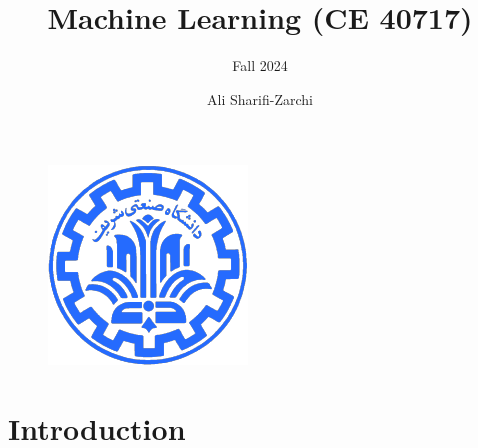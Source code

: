 \documentclass[serif, aspectratio=169]{beamer}
\author{Ali Sharifi-Zarchi}
\title{Machine Learning (CE 40717)}
\subtitle{Fall 2024}
\institute{
    CE Department \\
    Sharif University of Technology
}
\begin{document}
\begin{frame}
    \titlepage
    \vspace*{-0.6cm}
    \begin{figure}[htpb]
        \begin{center}
            \includegraphics[keepaspectratio, scale=0.25]{pic/sharif-main-logo.png}
        \end{center}
    \end{figure}
\end{frame}

\begin{frame}    
\tableofcontents[sectionstyle=show,
subsectionstyle=show/shaded/hide,
subsubsectionstyle=show/shaded/hide]
\end{frame}

\section{Introduction}
%
%
\end{document}
